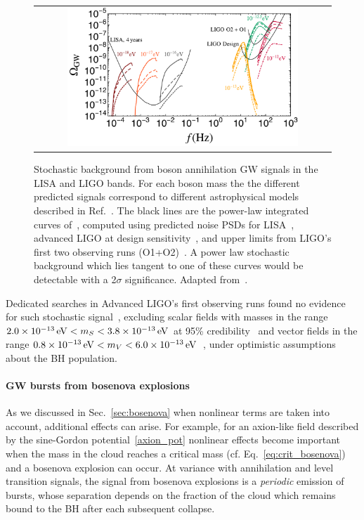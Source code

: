 \documentclass[11pt]{article}
\numberwithin{equation}{section} %
\begin{document}
%
\begin{figure}[thb]
\begin{center}
\begin{tabular}{c}
\includegraphics[width=0.8\textwidth]{background_allfreq.pdf}
\end{tabular}
\caption{Stochastic background from boson annihilation GW signals in the LISA and LIGO bands.
  For each boson mass the the different predicted signals correspond to different astrophysical models described in Ref.~\cite{Brito:2017wnc}. The black lines are the power-law integrated curves of~\cite{Thrane:2013oya}, computed using predicted
  noise PSDs for LISA~\cite{Audley:2017drz}, advanced LIGO at design sensitivity~\cite{LIGOScientific:2019vic}, and upper limits from LIGO's first two observing runs (O1+O2)~\cite{LIGOScientific:2019vic}. A power law stochastic background which lies tangent to one of these curves would be detectable with a 2$\sigma$ significance. Adapted from~\cite{Brito:2017wnc}. \label{fig:background}}
\end{center}
\end{figure}


Dedicated searches in Advanced LIGO's first observing runs found no evidence for such stochastic signal~\cite{Tsukada:2018mbp,Tsukada:2020lgt}, excluding scalar fields with masses in the range $2.0\times 10^{-13}\,{\rm eV}< m_S < 3.8\times 10^{-13} \,{\rm eV}$ at 95\% credibility~\cite{Tsukada:2018mbp} and vector fields in the range $0.8\times 10^{-13}\,{\rm eV}< m_V < 6.0\times 10^{-13} \,{\rm eV}$~\cite{Tsukada:2020lgt}, under optimistic assumptions about the BH population.

\paragraph{GW bursts from bosenova explosions}
As we discussed in Sec.~\ref{sec:bosenova} when nonlinear terms are taken into account, additional effects can arise. For example, for an axion-like field described by the sine-Gordon potential~\eqref{axion_pot} nonlinear effects become important when the mass in the cloud reaches a critical mass (cf. Eq.~\eqref{eq:crit_bosenova}) and a bosenova explosion can occur. At variance with annihilation and level transition signals, the signal from bosenova explosions is a \emph{periodic} emission of bursts, whose separation depends on the fraction of the cloud which remains bound to the BH after each subsequent collapse. 
\end{document}
